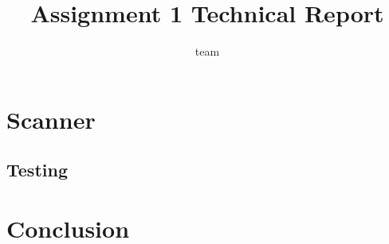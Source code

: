 \documentclass{report}
\title{Assignment 1 Technical Report}
\author{team}
\date{}
\begin{document}
\maketitle
\tableofcontents





\chapter{Scanner}





\section{Testing}


\chapter{Conclusion}



\end{document}
